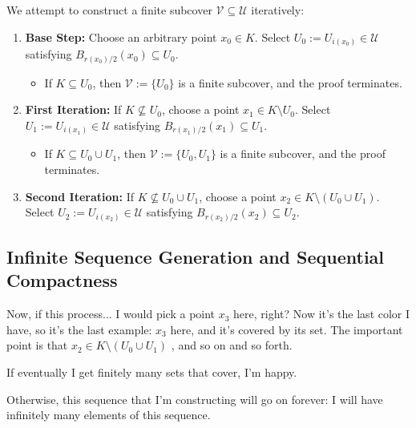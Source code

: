 \begin{proofWrapper}
\begin{content}
We attempt to construct a finite subcover $\mathcal{V} \subseteq \mathcal{U}$ iteratively:
\begin{enumerate}[label=\textbf{(\arabic*)}]
    \setcounter{enumi}{0}
    \item \textbf{Base Step:} Choose an arbitrary point $x_0 \in K$. Select $U_0 := U_{i(x_0)} \in \mathcal{U}$ satisfying $B_{r(x_0)/2}(x_0) \subseteq U_0$.
    \begin{itemize}
        \item If $K \subseteq U_0$, then $\mathcal{V} := \{ U_0 \}$ is a finite subcover, and the proof terminates.
    \end{itemize}
    \item \textbf{First Iteration:} If $K \not\subseteq U_0$, choose a point $x_1 \in K \setminus U_0$. Select $U_1 := U_{i(x_1)} \in \mathcal{U}$ satisfying $B_{r(x_1)/2}(x_1) \subseteq U_1$.
    \begin{itemize}
        \item If $K \subseteq U_0 \cup U_1$, then $\mathcal{V} := \{ U_0, U_1 \}$ is a finite subcover, and the proof terminates.
    \end{itemize}
    \item \textbf{Second Iteration:} If $K \not\subseteq U_0 \cup U_1$, choose a point $x_2 \in K \setminus (U_0 \cup U_1)$. Select $U_2 := U_{i(x_2)} \in \mathcal{U}$ satisfying $B_{r(x_2)/2}(x_2) \subseteq U_2$.
\end{enumerate}
\end{content}

\subsection{Infinite Sequence Generation and Sequential Compactness}

\begin{speech}[01:18:11 - 01:19:21]
Now, if this process... I would pick a point $x_3$ here, right? Now it's the last color I have, so it's the last example: $x_3$ here, and it's covered by its set. The important point is that $x_2 \in K \setminus (U_0 \cup U_1)$ , and so on and so forth.

If eventually I get finitely many sets that cover, I'm happy.

Otherwise, this sequence that I'm constructing will go on forever: I will have infinitely many elements of this sequence.


\end{speech}
\end{proofWrapper}

